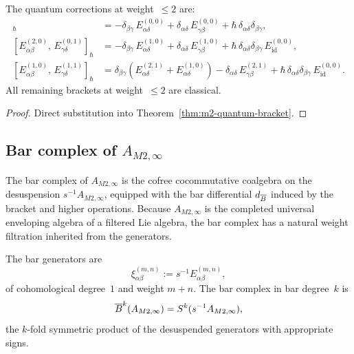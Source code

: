 \begin{corollary}
The quantum corrections at weight~$\le 2$ are:
\begin{align}
[E^{(1,0)}_{\alpha\beta},\,E^{(0,1)}_{\gamma\delta}]_{\hbar}
&= -\delta_{\beta\gamma}\,E^{(0,0)}_{\alpha\delta}
+ \delta_{\alpha\delta}\,E^{(0,0)}_{\gamma\beta}
+ \hbar\,\delta_{\alpha\delta}\delta_{\beta\gamma},
\\[4pt]
[E^{(2,0)}_{\alpha\beta},\,E^{(0,1)}_{\gamma\delta}]_{\hbar}
&= -\delta_{\beta\gamma}\,E^{(1,0)}_{\alpha\delta}
+ \delta_{\alpha\delta}\,E^{(1,0)}_{\gamma\beta}
+ \hbar\,\delta_{\alpha\delta}\delta_{\beta\gamma}\,E^{(0,0)}_{\mathrm{id}},
\\[4pt]
[E^{(1,0)}_{\alpha\beta},\,E^{(1,1)}_{\gamma\delta}]_{\hbar}
&= \delta_{\beta\gamma}(E^{(2,1)}_{\alpha\delta}
+ E^{(1,0)}_{\alpha\delta})
- \delta_{\alpha\delta}\,E^{(2,1)}_{\gamma\beta}
+ \hbar\,\delta_{\alpha\delta}\delta_{\beta\gamma}\,E^{(0,0)}_{\mathrm{id}}.
\end{align}
All remaining brackets at weight~$\le 2$ are classical.
\end{corollary}

\begin{proof}
Direct substitution into Theorem~\ref{thm:m2-quantum-bracket}.
\end{proof}


\subsection{Bar complex of \texorpdfstring{$A_{M2,\infty}$}{A\_\{M2,infinity\}}}

The bar complex of $A_{M2,\infty}$ is the cofree cocommutative
coalgebra on the desuspension $s^{-1}A_{M2,\infty}$, equipped with
the bar differential $d_{\overline{B}}$ induced by the bracket and
higher operations. Because $A_{M2,\infty}$ is the completed
universal enveloping algebra of a filtered Lie algebra, the bar
complex has a natural weight filtration inherited from the
generators.

\begin{definition}
The bar generators are
\[
\xi^{(m,n)}_{\alpha\beta} := s^{-1}E^{(m,n)}_{\alpha\beta},
\]
of cohomological degree~$1$ and weight $m+n$. The bar complex in
bar degree~$k$ is
\[
\overline{B}^k(A_{M2,\infty})
= S^k(s^{-1}A_{M2,\infty}),
\]
the $k$-fold symmetric product of the desuspended generators with
appropriate signs.
\end{definition}

